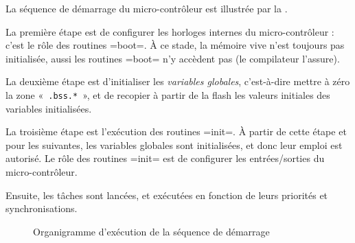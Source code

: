 



La séquence de démarrage du micro-contrôleur est illustrée par la .

La première étape est de configurer les horloges internes du micro-contrôleur : c'est le rôle des routines \omnibus=boot=. À ce stade, la mémoire vive n'est toujours pas initialisée, aussi les routines \omnibus=boot= n'y accèdent pas (le compilateur l'assure).

La deuxième étape est d'initialiser les \emph{variables globales}, c'est-à-dire mettre à zéro la zone «~\texttt{.bss.*}~», et de recopier à partir de la flash les valeurs initiales des variables initialisées.

La troisième étape est l'exécution des routines \omnibus=init=. À partir de cette étape et pour les suivantes, les variables globales sont initialisées, et donc leur emploi est autorisé. Le rôle des routines \omnibus=init= est de configurer les entrées/sorties du micro-contrôleur.

Ensuite, les tâches sont lancées, et exécutées en fonction de leurs priorités et synchronisations.

\begin{figure}[htbp]
  \centering
  \small
  \caption{Organigramme d'exécution de la séquence de démarrage}
\end{figure}


